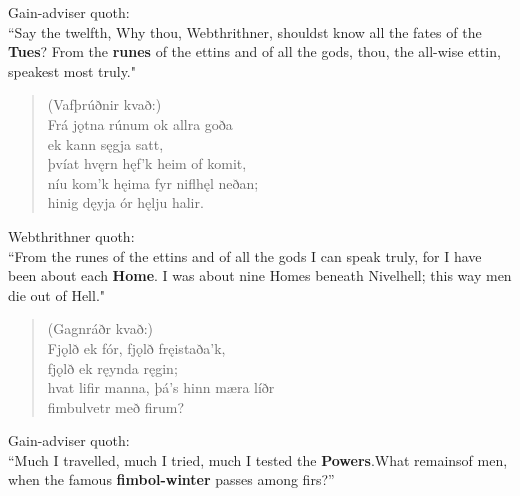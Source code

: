 \bvb Gain-adviser quoth: \\ “Say the twelfth, Why thou, Webthrithner, shouldst know all the fates of the \textbf{Tues}\footnotemark[73]? From the \textbf{runes} of the ettins and of all the gods, thou, the all-wise ettin, speakest most truly." \\

\begin{verse}
(Vafþrúðnir kvað:) \\%
\bva Frá jǫtna rúnum \hld ok allra goða \\%
\ind ek kann sęgja satt, \\%
þvíat hvęrn hęf'k \hld heim of komit, \\%
níu kom'k hęima \hld fyr niflhęl neðan; \\%
\ind hinig dęyja ór hęlju halir.\\%
\end{verse}

\bvb Webthrithner quoth: \\ “From the runes of the ettins and of all the gods I can speak truly, for I have been about each \textbf{Home}. I was about nine Homes beneath Nivelhell; this way men die out of Hell\footnotemark[1]." \\

\begin{verse}
(Gagnráðr kvað:) \\%
\bva Fjǫlð ek fór, \hld fjǫlð fręistaða'k, \\%
\ind fjǫlð ek ręynda ręgin; \\%
hvat lifir manna, \hld þá's hinn mæra líðr \\%
\ind fimbulvetr með firum?\\%
\end{verse}

\bvb Gain-adviser quoth: \\ “Much I travelled, much I tried, much I tested the \textbf{Powers}.\footnotemark[80] What remains\footnotemark[79] of men, when the famous \textbf{fimbol-winter} passes among firs\footnotemark[81]?” \\

